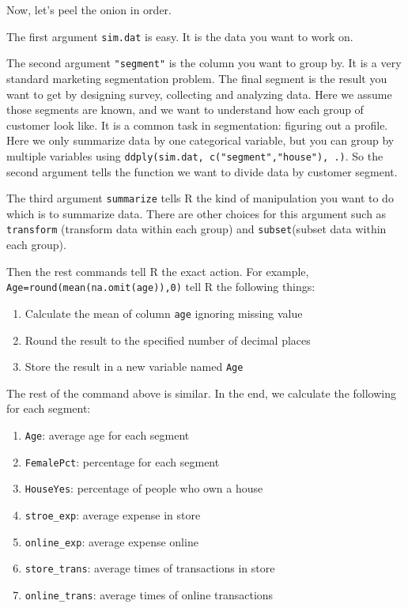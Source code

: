 \documentclass[
]{article}
\providecommand{\tightlist}{%
  \setlength{\itemsep}{0pt}\setlength{\parskip}{0pt}}
\begin{document}
Now, let's peel the onion in order.

The first argument \texttt{sim.dat} is easy. It is the data you want to
work on.

The second argument \texttt{"segment"} is the column you want to group
by. It is a very standard marketing segmentation problem. The final
segment is the result you want to get by designing survey, collecting
and analyzing data. Here we assume those segments are known, and we want
to understand how each group of customer look like. It is a common task
in segmentation: figuring out a profile. Here we only summarize data by
one categorical variable, but you can group by multiple variables using
\texttt{ddply(sim.dat,\ c("segment","house"),\ .)}. So the second
argument tells the function we want to divide data by customer segment.

The third argument \texttt{summarize} tells R the kind of manipulation
you want to do which is to summarize data. There are other choices for
this argument such as \texttt{transform} (transform data within each
group) and \texttt{subset}(subset data within each group).

Then the rest commands tell R the exact action. For example,
\texttt{Age=round(mean(na.omit(age)),0)} tell R the following things:

\begin{enumerate}
\def\labelenumi{\arabic{enumi}.}
\tightlist
\item
  Calculate the mean of column \texttt{age} ignoring missing value
\item
  Round the result to the specified number of decimal places
\item
  Store the result in a new variable named \texttt{Age}
\end{enumerate}

The rest of the command above is similar. In the end, we calculate the
following for each segment:

\begin{enumerate}
\def\labelenumi{\arabic{enumi}.}
\tightlist
\item
  \texttt{Age}: average age for each segment
\item
  \texttt{FemalePct}: percentage for each segment
\item
  \texttt{HouseYes}: percentage of people who own a house
\item
  \texttt{stroe\_exp}: average expense in store
\item
  \texttt{online\_exp}: average expense online
\item
  \texttt{store\_trans}: average times of transactions in store
\item
  \texttt{online\_trans}: average times of online transactions
\end{enumerate}
\end{document}
